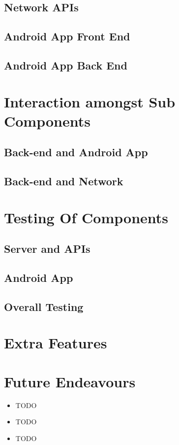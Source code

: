 \documentclass{article}
\begin{document}
			\subsection{Network APIs}
			\subsection{Android App Front End}
			\subsection{Android App Back End}
	
	\section{Interaction amongst Sub Components}
			\subsection{Back-end and Android App}
			\subsection{Back-end and Network}
	
	\section{Testing Of Components}
			\subsection{Server and APIs}
			\subsection{Android App}
			\subsection{Overall Testing}
	
	\section{Extra Features}

	\section{Future Endeavours}
		\begin{itemize} 
			\item TODO
			\item TODO
			\item TODO
		\end{itemize}   

	
	\medskip
	
\end{document}
